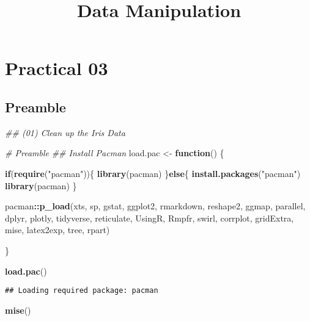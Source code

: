 \documentclass[
]{article}
\title{Data Manipulation}
\author{}
\date{\vspace{-2.5em}}
\newenvironment{Shaded}{\begin{snugshade}}{\end{snugshade}}
\newcommand{\CommentTok}[1]{\textcolor[rgb]{0.56,0.35,0.01}{\textit{#1}}}
\newcommand{\ControlFlowTok}[1]{\textcolor[rgb]{0.13,0.29,0.53}{\textbf{#1}}}
\newcommand{\KeywordTok}[1]{\textcolor[rgb]{0.13,0.29,0.53}{\textbf{#1}}}
\newcommand{\NormalTok}[1]{#1}
\newcommand{\OperatorTok}[1]{\textcolor[rgb]{0.81,0.36,0.00}{\textbf{#1}}}
\newcommand{\StringTok}[1]{\textcolor[rgb]{0.31,0.60,0.02}{#1}}
\begin{document}
\maketitle

\hypertarget{practical-03}{%
\section{Practical 03}\label{practical-03}}

\hypertarget{preamble}{%
\subsection{Preamble}\label{preamble}}

\begin{Shaded}
\begin{Highlighting}[]
\CommentTok{\#\# (01) Clean up the Iris Data}

\CommentTok{\# Preamble}
\CommentTok{\#\# Install Pacman}
\NormalTok{load.pac <{-}}\StringTok{ }\ControlFlowTok{function}\NormalTok{() \{}
  
  \ControlFlowTok{if}\NormalTok{(}\KeywordTok{require}\NormalTok{(}\StringTok{"pacman"}\NormalTok{))\{}
    \KeywordTok{library}\NormalTok{(pacman)}
\NormalTok{  \}}\ControlFlowTok{else}\NormalTok{\{}
    \KeywordTok{install.packages}\NormalTok{(}\StringTok{"pacman"}\NormalTok{)}
    \KeywordTok{library}\NormalTok{(pacman)}
\NormalTok{  \}}
  
\NormalTok{  pacman}\OperatorTok{::}\KeywordTok{p\_load}\NormalTok{(xts, sp, gstat, ggplot2, rmarkdown, reshape2, ggmap,}
\NormalTok{                 parallel, dplyr, plotly, tidyverse, reticulate, UsingR, Rmpfr,}
\NormalTok{                 swirl, corrplot, gridExtra, mise, latex2exp, tree, rpart)}
  
\NormalTok{\}}

\KeywordTok{load.pac}\NormalTok{()}
\end{Highlighting}
\end{Shaded}

\begin{verbatim}
## Loading required package: pacman
\end{verbatim}

\begin{Shaded}
\begin{Highlighting}[]
\KeywordTok{mise}\NormalTok{()}
\end{Highlighting}
\end{Shaded}
\end{document}
